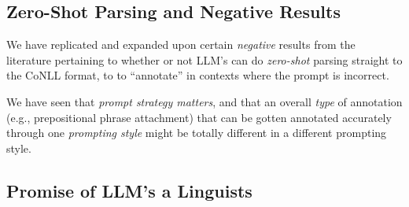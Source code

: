 \label{sec:discussion}

\subsection{Zero-Shot Parsing and Negative Results}
We have replicated and expanded upon certain {\em negative} results from the literature pertaining to whether or not LLM's can do {\em zero-shot} parsing straight to the CoNLL format, to to ``annotate'' in contexts where the prompt is incorrect.

We have seen that {\em prompt strategy matters}, and that an overall {\em type} of annotation (e.g., prepositional phrase attachment) that can be gotten annotated accurately through one {\em prompting style} might be totally different in a different prompting style.

\subsection{Promise of LLM's a Linguists}